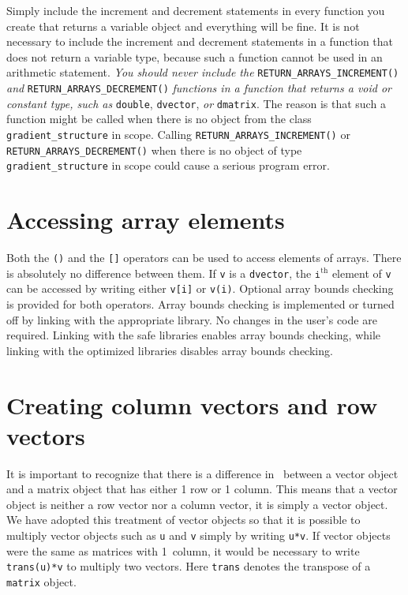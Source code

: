 \documentclass{admbmanual}
\begin{document}
Simply include the increment and decrement statements in every function you
create that returns a variable object and everything will be fine. It is not
necessary to include the increment and decrement statements in a function that
does not return a variable type, because such a function cannot be used in an
arithmetic statement. \textit{You should never include the}
\texttt{RETURN\_ARRAYS\_INCREMENT()} \textit{and}
\texttt{RETURN\_ARRAYS\_DECREMENT()}
\textit{functions in a function that returns a void or constant type, such as}
\texttt{double}, \texttt{dvector}, \textit{or} \texttt{dmatrix}. The reason is
that such a function might be called when there is no object from the class
\texttt{gradient\_structure} in scope. Calling
\texttt{RETURN\_ARRAYS\_INCREMENT()} or \texttt{RETURN\_ARRAYS\_DE\-CRE\-MENT()}
when there is no object of type \texttt{gradient\_structure} in scope could
cause a serious program error.

\section{Accessing array elements}

Both the \texttt{()} and the \texttt{[]} operators can be used to access
elements of arrays. There is absolutely no difference between them. If
\texttt{v} is a \texttt{dvector}, the $\texttt{i}^\textrm{th}$ element of
\texttt{v} can be accessed by writing either \texttt{v[i]} or \texttt{v(i)}.
Optional array bounds checking is provided for both operators. Array bounds
checking is implemented or turned off by linking with the appropriate library.
No changes in the user's code are required. Linking with the safe libraries
enables array bounds checking, while linking with the optimized libraries
disables array bounds checking.

\section{Creating column vectors and row vectors}

It is important to recognize that there is a difference in \scAD\ between a
vector object and a matrix object that has either 1 row or 1 column. This means
that a vector object is neither a row vector nor a column vector, it is simply a
vector object. We have adopted this treatment of vector objects so that it is
possible to multiply vector objects such as \texttt{u} and \texttt{v} simply by
writing \texttt{u*v}. If vector objects were the same as matrices with 1~column,
it would be necessary to write \texttt{trans(u)*v} to multiply two vectors. Here
\texttt{trans} denotes the transpose of a \texttt{matrix} object.
\end{document}
